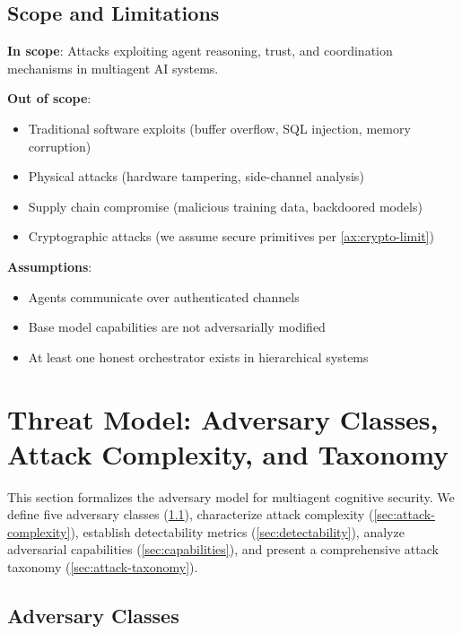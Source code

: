 \documentclass[
]{article}
\begin{document}
\subsection{Scope and Limitations}\label{sec:scope}

\textbf{In scope}: Attacks exploiting agent reasoning, trust, and
coordination mechanisms in multiagent AI systems.

\textbf{Out of scope}:

\begin{itemize}
\item Traditional software exploits (buffer overflow, SQL injection, memory corruption)
\item Physical attacks (hardware tampering, side-channel analysis)
\item Supply chain compromise (malicious training data, backdoored models)
\item Cryptographic attacks (we assume secure primitives per \cref{ax:crypto-limit})
\end{itemize}

\textbf{Assumptions}:

\begin{itemize}
\item Agents communicate over authenticated channels
\item Base model capabilities are not adversarially modified
\item At least one honest orchestrator exists in hierarchical systems
\end{itemize}

\newpage

\newpage

\section{Threat Model: Adversary Classes, Attack Complexity, and
Taxonomy}\label{sec:threat-model}

This section formalizes the adversary model for multiagent cognitive
security. We define five adversary classes
(\cref{sec:adversary-classes}), characterize attack complexity
(\cref{sec:attack-complexity}), establish detectability metrics
(\cref{sec:detectability}), analyze adversarial capabilities
(\cref{sec:capabilities}), and present a comprehensive attack taxonomy
(\cref{sec:attack-taxonomy}).

\subsection{Adversary Classes}\label{sec:adversary-classes}
\end{document}
